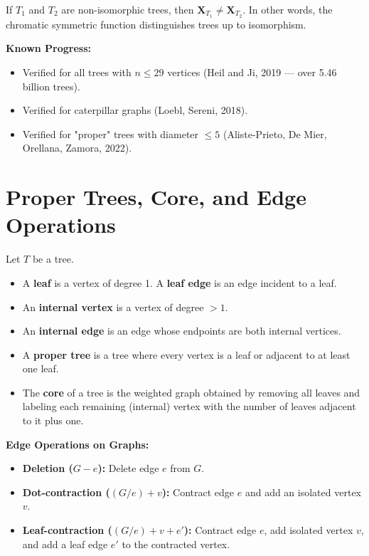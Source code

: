 \documentclass[12pt]{memoir}
\begin{document}
\begin{ptcb}
\begin{Th}
If $T_1$ and $T_2$ are non-isomorphic trees, then $\mathbf{X}_{T_1} \neq \mathbf{X}_{T_2}$.
In other words, the chromatic symmetric function distinguishes trees up to isomorphism.
\end{Th}
\end{ptcb}

\textbf{Known Progress:}
\begin{itemize}
    \item Verified for all trees with $n \le 29$ vertices (Heil and Ji, 2019 — over 5.46 billion trees).
    \item Verified for caterpillar graphs (Loebl, Sereni, 2018).
    \item Verified for "proper" trees with diameter $\le 5$ (Aliste-Prieto, De Mier, Orellana, Zamora, 2022).
\end{itemize}

\newpage

\section{Proper Trees, Core, and Edge Operations}

\begin{ptcb}
\begin{Def}
Let $T$ be a tree.
\begin{itemize}
    \item A \textbf{leaf} is a vertex of degree 1. A \textbf{leaf edge} is an edge incident to a leaf.
    \item An \textbf{internal vertex} is a vertex of degree $> 1$.
    \item An \textbf{internal edge} is an edge whose endpoints are both internal vertices.
    \item A \textbf{proper tree} is a tree where every vertex is a leaf or adjacent to at least one leaf.
    \item The \textbf{core} of a tree is the weighted graph obtained by removing all leaves and labeling each remaining (internal) vertex with the number of leaves adjacent to it plus one.
\end{itemize}
\end{Def}
\end{ptcb}

\begin{ptcb}
\textbf{Edge Operations on Graphs:}
\begin{itemize}
    \item \textbf{Deletion ($G - e$):} Delete edge $e$ from $G$.
    \item \textbf{Dot-contraction ($(G/e) + v$):} Contract edge $e$ and add an isolated vertex $v$.
    \item \textbf{Leaf-contraction ($(G/e) + v + e'$):} Contract edge $e$, add isolated vertex $v$, and add a leaf edge $e'$ to the contracted vertex.
\end{itemize}
\end{ptcb}
\end{document}
